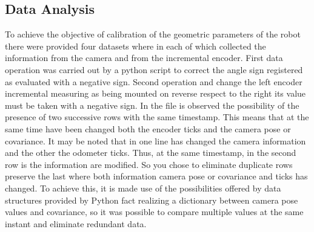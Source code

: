 \subsection{Data Analysis}
To achieve the objective of calibration of the geometric parameters of the robot there were provided four datasets where in each of which collected the information from the camera and from the incremental encoder.
First data operation was carried out by a python script to correct the angle sign registered as evaluated with a negative sign.
Second operation and change the left encoder incremental measuring as being mounted on reverse respect to the right its value must be taken with a negative sign.
In the file is observed the possibility of the presence of two successive rows with the same timestamp. This means that at the same time have been changed both the encoder ticks and the camera pose or covariance.
It may be noted that in one line has changed the camera information and the other the odometer ticks. Thus, at the same timestamp, in the second row is the information are modified.
So you chose to eliminate duplicate rows preserve the last where both information camera pose or covariance and ticks has changed.
To achieve this, it is made use of the possibilities offered by data structures provided by Python fact realizing a dictionary between camera pose values and covariance, so it was possible to compare multiple values at the same instant and eliminate redundant data.